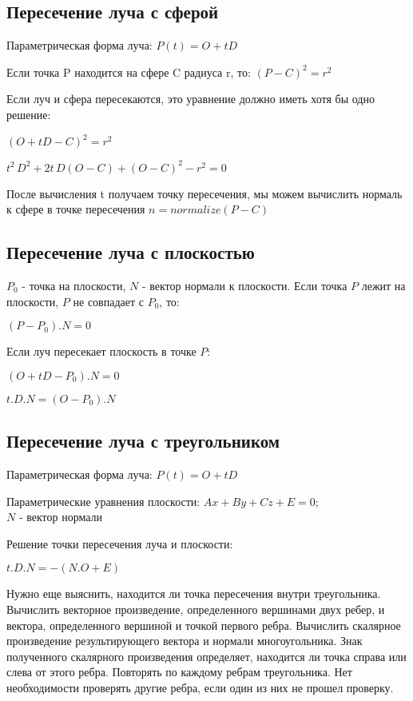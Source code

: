 \pagebreak
\subsection*{Пересечение луча с сферой}

Параметрическая форма луча:
$P(t) = O + tD$

Если точка P находится на сфере C радиуса r, то:
$(P-C)^2=r^2$

Если луч и сфера пересекаются, это уравнение должно иметь хотя бы одно решение:

$
(O + tD - C)^2 = r^2
$

$
t^2 \, D^2 + 2t \, D(O-C) + (O-C)^2 - r^2 = 0
$

После вычисления t получаем точку пересечения, мы можем вычислить нормаль к сфере в точке пересечения
$n = normalize(P-C)$


\subsection*{Пересечение луча с плоскостью}

$P_0$ - точка на плоскости, $N$ - вектор нормали к плоскости. Если точка $P$ лежит на плоскости, $P$ не совпадает с $P_0$, то:

$(P - P_0).N = 0$

Если луч пересекает плоскость в точке $P$:

$(O + tD - P_0).N = 0$

$t.D.N = (O-P_0).N$


\subsection*{Пересечение луча с треугольником}

Параметрическая форма луча: $P(t) = O + tD$

Параметрические уравнения плоскости: $Ax + By + Cz + E = 0$;\\
$N$ - вектор нормали

Решение точки пересечения луча и плоскости:

$t.D.N = -(N.O + E)$

Нужно еще выяснить, находится ли точка пересечения внутри треугольника.
Вычислить векторное произведение, определенного вершинами двух
ребер, и вектора, определенного вершиной и точкой первого ребра.
Вычислить скалярное произведение результирующего вектора и нормали многоугольника.
Знак полученного скалярного произведения определяет, находится ли точка
справа или слева от этого ребра. Повторять по каждому ребрам треугольника.
Нет необходимости проверять другие ребра, если один из них не прошел проверку.


